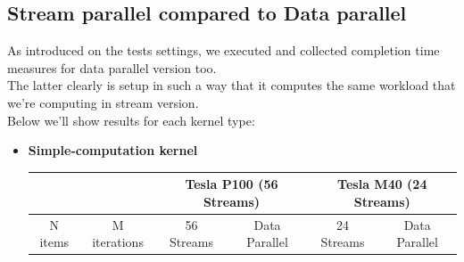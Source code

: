 \subsection{Stream parallel compared to Data parallel}
As introduced on the tests settings, we executed and collected completion time measures for data parallel version too.\\
The latter clearly is setup in such a way that it computes the same workload that we're computing in stream version.\\
Below we'll show results for each kernel type:
\begin{itemize}
	\item \textbf{Simple-computation kernel}\\%
		
	\begin{table}
		\centering
		\begin{tabular}{ | c  c || c | c  || c | c || } 
			\hline
			& &  \multicolumn{2}{c}{\textbf{Tesla P100 (56 Streams)}}& \multicolumn{2}{c}{\textbf{Tesla M40 (24 Streams)}} \\ [0.5ex]
			\hline		
			N items &	M iterations &	56 Streams & Data Parallel &	24 Streams & Data Parallel\\
			\hline	\hline	
			

\end{tabular}
\end{table}
\end{itemize}
